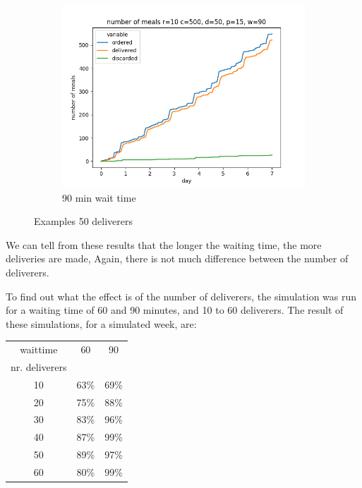 \begin{center}
\begin{figure}
\begin{subfigure}[m]{0.30\textwidth}
        \end{subfigure}
        \hfill
        \begin{subfigure}[m]{0.30\textwidth}
            \centering
            \includegraphics[width=\textwidth]{sections/run4/week_nd_3_food_ordering_distribution_500_10_50_90}
            \caption{90 min wait time}
        \end{subfigure}
        \caption{Examples 50 deliverers}
        \label{fig:examples 50 deliverers different wait time}
    \end{figure}
\end{center}

We can tell from these results that the longer the waiting time, the more deliveries are made,
Again, there is not much difference between the number of deliverers.

To find out what the effect is of the number of deliverers, the simulation was run for a waiting time of 60 and 90 minutes,
and 10 to 60 deliverers.
The result of these simulations, for a simulated week, are:

\begin{center}
    \begin{tabular}{ |c|c|c| }
        \hline
        waittime       & 60   & 90   \\
        nr. deliverers &      &      \\
        \hline
        \hline
        10             & 63\% & 69\% \\
        \hline
        20             & 75\% & 88\% \\
        \hline
        30             & 83\% & 96\% \\
        \hline
        40             & 87\% & 99\% \\
        \hline
        50             & 89\% & 97\% \\
        \hline
        60             & 80\% & 99\% \\
        \hline
    \end{tabular}
\end{center}

